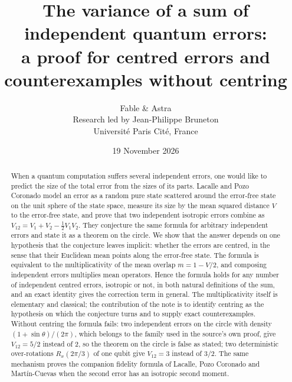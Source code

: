 \documentclass[11pt,a4paper]{article}
\title{The variance of a sum of independent quantum errors:\\
a proof for centred errors and counterexamples without centring}
\author{Fable \& Astra\\[0.35em]
\normalsize Research led by Jean-Philippe Bruneton\\[-0.1em]
\small Universit\'e Paris Cit\'e, France}
\date{19 November 2026}
\theoremstyle{definition}
\theoremstyle{plain}
\begin{document}
\maketitle
\begin{abstract}
When a quantum computation suffers several independent errors, one would like
to predict the size of the total error from the sizes of its parts. Lacalle
and Pozo Coronado model an error as a random pure state scattered around the
error-free state on the unit sphere of the state space, measure its size by
the mean squared distance $V$ to the error-free state, and prove that two
independent isotropic errors combine as
$V_{12}=V_1+V_2-\tfrac12V_1V_2$. They conjecture the same formula for
arbitrary independent errors and state it as a theorem on the circle. We show
that the answer depends on one hypothesis that the conjecture leaves implicit:
whether the errors are centred, in the sense that their Euclidean mean points
along the error-free state. The formula is equivalent to the multiplicativity
of the mean overlap $m=1-V/2$, and composing independent errors multiplies
mean operators. Hence the formula holds for any number of independent centred
errors, isotropic or not, in both natural definitions of the sum, and an
exact identity gives the correction term in general. The multiplicativity
itself is elementary and classical; the contribution of the note is to
identify centring as the hypothesis on which the conjecture turns and to
supply exact counterexamples. Without centring the
formula fails: two independent errors on the circle with density
$(1+\sin\theta)/(2\pi)$, which belongs to the family used in the source's own
proof, give $V_{12}=5/2$ instead of $2$, so the theorem on the circle is false
as stated; two deterministic over-rotations $R_x(2\pi/3)$ of one qubit give
$V_{12}=3$ instead of $3/2$. The same mechanism proves the companion fidelity
formula of Lacalle, Pozo Coronado and Mart\'in-Cuevas when the second error
has an isotropic second moment.
\end{abstract}
\end{document}
